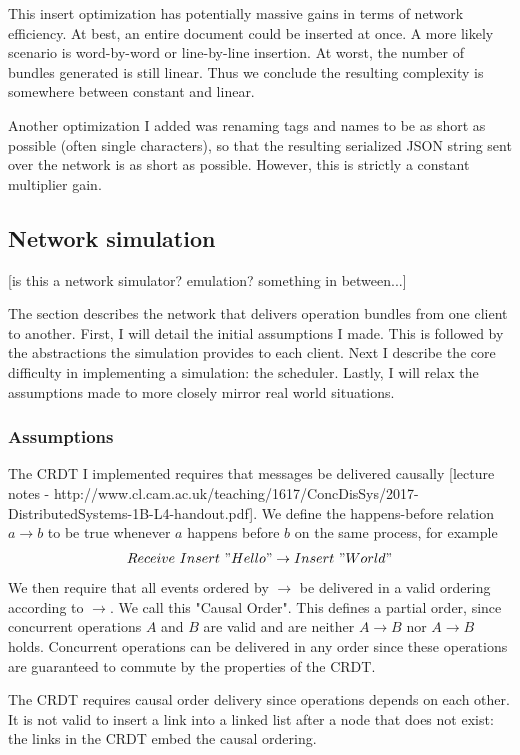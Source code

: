 \documentclass[12pt,a4paper,twoside,openright]{report}
\begin{document}
			This insert optimization has potentially massive gains in terms of network efficiency. At best, an entire document could be inserted at once. A more likely scenario is word-by-word or line-by-line insertion. At worst, the number of bundles generated is still linear. Thus we conclude the resulting complexity is somewhere between constant and linear.
			
			Another optimization I added was renaming tags and names to be as short as possible (often single characters), so that the resulting serialized JSON string sent over the network is as short as possible. However, this is strictly a constant multiplier gain.
	
	\subsection{Network simulation}
	
		[is this a network simulator? emulation? something in between...]
	
		The section describes the network that delivers operation bundles from one client to another. First, I will detail the initial assumptions I made. This is followed by the abstractions the simulation provides to each client. Next I describe the core difficulty in implementing a simulation: the scheduler. Lastly, I will relax the assumptions made to more closely mirror real world situations.
		
		\subsubsection{Assumptions} 
		The CRDT I implemented requires that messages be delivered causally [lecture notes - http://www.cl.cam.ac.uk/teaching/1617/ConcDisSys/2017-DistributedSystems-1B-L4-handout.pdf]. We define the happens-before relation \(a \rightarrow b\) to be true whenever $a$ happens before $b$ on the same process, for example \[Receive\ Insert\ "Hello" \rightarrow Insert\ " World"\]
		We then require that all events ordered by $\rightarrow$ be delivered in a valid ordering according to $\rightarrow$. We call this "Causal Order". 	
		This defines a partial order, since concurrent operations $A$ and $B$ are valid and are neither $A \rightarrow B$ nor $A \rightarrow B$ holds. Concurrent operations can be delivered in any order since these operations are guaranteed to commute by the properties of the CRDT.
		
		The CRDT requires causal order delivery since operations depends on each other. It is not valid to insert a link into a linked list after a node that does not exist: the links in the CRDT embed the causal ordering.
		
\end{document}
